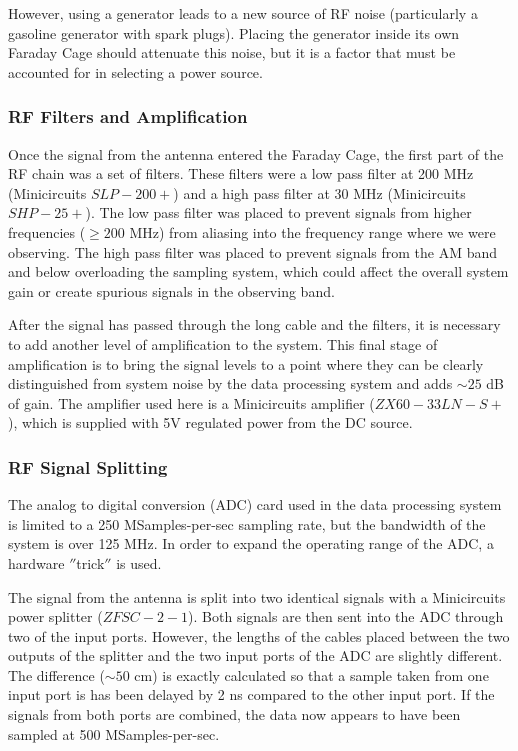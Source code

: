 However, using a generator leads to a new source of RF noise (particularly a gasoline generator with spark plugs). Placing the generator inside its own Faraday Cage should attenuate this noise, but it is a factor that must be accounted for in selecting a power source. 

\subsubsection{RF Filters and Amplification} \label{Sec:fcage_elec}
Once the signal from the antenna entered the Faraday Cage, the first part of the RF chain was a set of filters. These filters were a low pass filter at 200 MHz (Minicircuits $SLP-200+$) and a high pass filter at 30 MHz (Minicircuits $SHP-25+$). The low pass filter was placed to prevent signals from higher frequencies ($\geq 200$ MHz) from aliasing into the frequency range where we were observing. The high pass filter was placed to prevent signals from the AM band and below overloading the sampling system, which could affect the overall system gain or create spurious signals in the observing band. 

After the signal has passed through the long cable and the filters, it is necessary to add another level of amplification to the system. This final stage of amplification is to bring the signal levels to a point where they can be clearly distinguished from system noise by the data processing system and adds $\sim25$ dB of gain. The amplifier used here is a Minicircuits amplifier ($ZX60-33LN-S+$), which is supplied with 5V regulated power from the DC source. 

\subsubsection{RF Signal Splitting} \label{Sec:hard_split}
The analog to digital conversion (ADC) card used in the data processing system is limited to a 250 MSamples-per-sec sampling rate, but the bandwidth of the system is over 125 MHz. In order to expand the operating range of the ADC, a hardware $''$trick$''$ is used.

The signal from the antenna is split into two identical signals with a Minicircuits power splitter ($ZFSC-2-1$). Both signals are then sent into the ADC through two of the input ports. However, the lengths of the cables placed between the two outputs of the splitter and the two input ports of the ADC are slightly different. The difference ($\sim 50$ cm) is exactly calculated so that a sample taken from one input port is has been delayed by 2 ns compared to the other input port. If the signals from both ports are combined, the data now appears to have been sampled at 500 MSamples-per-sec. 

